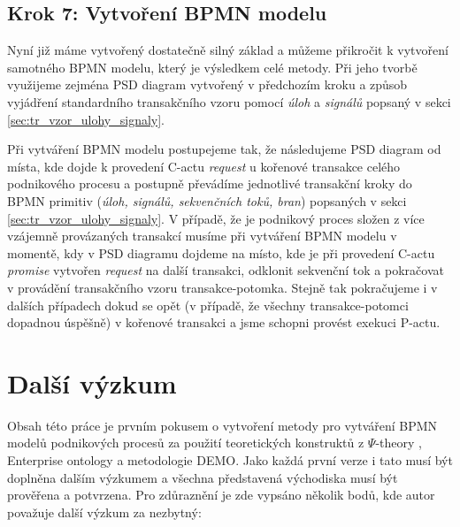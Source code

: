 \documentclass[]{article}
\newcommand{\ptheory}{$\Psi$-theory }
\begin{document}
\subsection{Krok 7: Vytvoření BPMN modelu}
Nyní již máme vytvořený dostatečně silný základ a můžeme přikročit k vytvoření samotného BPMN modelu, který je výsledkem celé metody. Při jeho tvorbě využijeme zejména PSD diagram vytvořený v předchozím kroku a způsob vyjádření standardního transakčního vzoru pomocí \textit{úloh} a \textit{signálů} popsaný v sekci \ref{sec:tr_vzor_ulohy_signaly}.

Při vytváření BPMN modelu postupejeme tak, že následujeme PSD diagram od místa, kde dojde k provedení C-actu \textit{request} u kořenové transakce celého podnikového procesu a postupně převádíme jednotlivé transakční kroky do BPMN primitiv (\textit{úloh, signálů, sekvenčních toků, bran}) popsaných v sekci \ref{sec:tr_vzor_ulohy_signaly}. V případě, že je podnikový proces složen z více vzájemně provázaných transakcí musíme při vytváření BPMN modelu v momentě, kdy v PSD diagramu dojdeme na místo, kde je při provedení C-actu \textit{promise} vytvořen \textit{request} na další transakci, odklonit sekvenční tok a pokračovat v provádění transakčního vzoru transakce-potomka. Stejně tak pokračujeme i v dalších případech dokud se opět  (v případě, že všechny transakce-potomci dopadnou úspěšně) v kořenové transakci a jsme schopni provést exekuci P-actu.


\section{Další výzkum}

Obsah této práce je prvním pokusem o vytvoření metody pro vytváření BPMN modelů podnikových procesů za použití teoretických konstruktů z \ptheory, Enterprise ontology a metodologie DEMO. Jako každá první verze i tato musí být doplněna dalším výzkumem a všechna představená východiska musí být prověřena a potvrzena. Pro zdůraznění je zde vypsáno několik bodů, kde autor považuje další výzkum za nezbytný:
\end{document}
